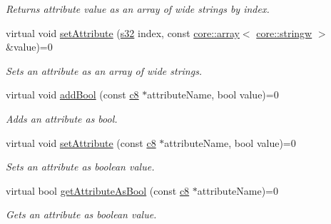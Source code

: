 \begin{DoxyCompactItemize}
\begin{DoxyCompactList}\small\item\em Returns attribute value as an array of wide strings by index. \end{DoxyCompactList}\item 
\mbox{\label{classirr_1_1io_1_1IAttributes_aa4e2e82c29e917cac49d92ac30628099}} 
virtual void \hyperlink{classirr_1_1io_1_1IAttributes_aa4e2e82c29e917cac49d92ac30628099}{set\+Attribute} (\hyperlink{namespaceirr_ac66849b7a6ed16e30ebede579f9b47c6}{s32} index, const \hyperlink{classirr_1_1core_1_1array}{core\+::array}$<$ \hyperlink{namespaceirr_1_1core_aef83fafbb1b36fcce44c07c9be23a7f2}{core\+::stringw} $>$ \&value)=0
\begin{DoxyCompactList}\small\item\em Sets an attribute as an array of wide strings. \end{DoxyCompactList}\item 
\mbox{\label{classirr_1_1io_1_1IAttributes_a3335f912c0dfcf0e88f662796314123b}} 
virtual void \hyperlink{classirr_1_1io_1_1IAttributes_a3335f912c0dfcf0e88f662796314123b}{add\+Bool} (const \hyperlink{namespaceirr_a9395eaea339bcb546b319e9c96bf7410}{c8} $\ast$attribute\+Name, bool value)=0
\begin{DoxyCompactList}\small\item\em Adds an attribute as bool. \end{DoxyCompactList}\item 
\mbox{\label{classirr_1_1io_1_1IAttributes_a1c145485baeebae6066cee83af3a6b31}} 
virtual void \hyperlink{classirr_1_1io_1_1IAttributes_a1c145485baeebae6066cee83af3a6b31}{set\+Attribute} (const \hyperlink{namespaceirr_a9395eaea339bcb546b319e9c96bf7410}{c8} $\ast$attribute\+Name, bool value)=0
\begin{DoxyCompactList}\small\item\em Sets an attribute as boolean value. \end{DoxyCompactList}\item 
virtual bool \hyperlink{classirr_1_1io_1_1IAttributes_a197407f5b0f1d0c1aefab3e1b8d7c02d}{get\+Attribute\+As\+Bool} (const \hyperlink{namespaceirr_a9395eaea339bcb546b319e9c96bf7410}{c8} $\ast$attribute\+Name)=0
\begin{DoxyCompactList}\small\item\em Gets an attribute as boolean value. \end{DoxyCompactList}\item 

\end{DoxyCompactItemize}
